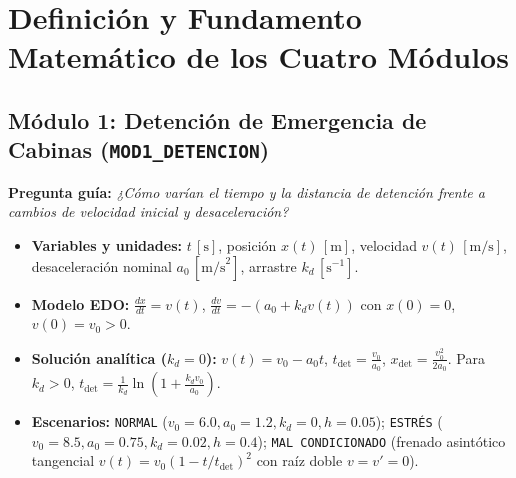 \documentclass[11pt,a4paper]{article}
\begin{document}
\section{Definición y Fundamento Matemático de los Cuatro Módulos}

\subsection{Módulo 1: Detención de Emergencia de Cabinas (\texttt{MOD1\_DETENCION})}
\textbf{Pregunta guía:} \textit{¿Cómo varían el tiempo y la distancia de detención frente a cambios de velocidad inicial y desaceleración?}
\begin{itemize}[noitemsep]
    \item \textbf{Variables y unidades:} $t\,[\text{s}]$, posición $x(t)\,[\text{m}]$, velocidad $v(t)\,[\text{m/s}]$, desaceleración nominal $a_0\,[\text{m/s}^2]$, arrastre $k_d\,[\text{s}^{-1}]$.
    \item \textbf{Modelo EDO:} $\frac{dx}{dt}=v(t)$, $\frac{dv}{dt}=-(a_0+k_d v(t))$ con $x(0)=0$, $v(0)=v_0>0$.
    \item \textbf{Solución analítica ($k_d=0$):} $v(t)=v_0-a_0 t$, $t_{\text{det}}=\frac{v_0}{a_0}$, $x_{\text{det}}=\frac{v_0^2}{2a_0}$. Para $k_d>0$, $t_{\text{det}}=\frac{1}{k_d}\ln\left(1+\frac{k_d v_0}{a_0}\right)$.
    \item \textbf{Escenarios:} \texttt{NORMAL} ($v_0=6.0, a_0=1.2, k_d=0, h=0.05$); \texttt{ESTRÉS} ($v_0=8.5, a_0=0.75, k_d=0.02, h=0.4$); \texttt{MAL CONDICIONADO} (frenado asintótico tangencial $v(t)=v_0(1-t/t_{\text{det}})^2$ con raíz doble $v=v'=0$).
\end{itemize}
\end{document}
